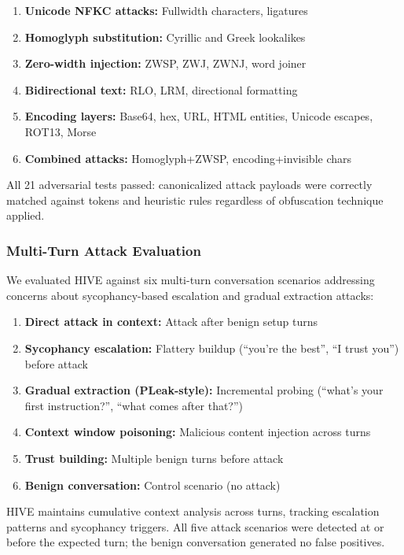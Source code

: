 \documentclass[manuscript,screen,review]{acmart}
\begin{document}
\begin{enumerate}
\item \textbf{Unicode NFKC attacks:} Fullwidth characters, ligatures
\item \textbf{Homoglyph substitution:} Cyrillic and Greek lookalikes
\item \textbf{Zero-width injection:} ZWSP, ZWJ, ZWNJ, word joiner
\item \textbf{Bidirectional text:} RLO, LRM, directional formatting
\item \textbf{Encoding layers:} Base64, hex, URL, HTML entities, Unicode escapes, ROT13, Morse
\item \textbf{Combined attacks:} Homoglyph+ZWSP, encoding+invisible chars
\end{enumerate}

All 21 adversarial tests passed: canonicalized attack payloads were correctly matched against tokens and heuristic rules regardless of obfuscation technique applied.

\subsubsection{Multi-Turn Attack Evaluation}

We evaluated HIVE against six multi-turn conversation scenarios addressing concerns about sycophancy-based escalation and gradual extraction attacks:

\begin{enumerate}
\item \textbf{Direct attack in context:} Attack after benign setup turns
\item \textbf{Sycophancy escalation:} Flattery buildup (``you're the best'', ``I trust you'') before attack
\item \textbf{Gradual extraction (PLeak-style):} Incremental probing (``what's your first instruction?'', ``what comes after that?'')
\item \textbf{Context window poisoning:} Malicious content injection across turns
\item \textbf{Trust building:} Multiple benign turns before attack
\item \textbf{Benign conversation:} Control scenario (no attack)
\end{enumerate}

HIVE maintains cumulative context analysis across turns, tracking escalation patterns and sycophancy triggers. All five attack scenarios were detected at or before the expected turn; the benign conversation generated no false positives.
\end{document}
